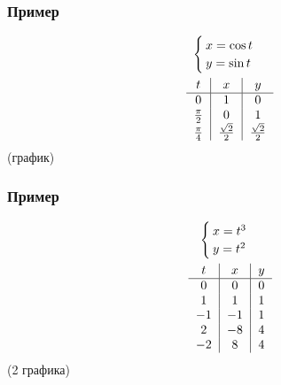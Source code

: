 \documentclass{article}
\begin{document}
\subsubsection{Пример}
\begin{gather*}
    \begin{cases}
        x = \cos t \\
        y = \sin t
    \end{cases} \\
    \begin{tabular}{c|c|c}
        $t$             & $x$                  & $y$                  \\
        \hline
        $0$             & $1$                  & $0$                  \\
        $\frac{\pi}{2}$ & $0$                  & $1$                  \\
        $\frac{\pi}{4}$ & $\frac{\sqrt{2}}{2}$ & $\frac{\sqrt{2}}{2}$
    \end{tabular}
\end{gather*}
(график)

\subsubsection{Пример}
\begin{gather*}
    \begin{cases}
        x = t^3 \\
        y = t^2
    \end{cases} \\
    \begin{tabular}{c|c|c}
        $t$ & $x$ & $y$ \\
        \hline
        $0$  & $0$  & $0$ \\
        $1$  & $1$  & $1$ \\
        $-1$ & $-1$ & $1$ \\
        $2$  & $-8$ & $4$ \\
        $-2$ & $8$  & $4$
    \end{tabular}
\end{gather*}
(2 графика)
\end{document}
